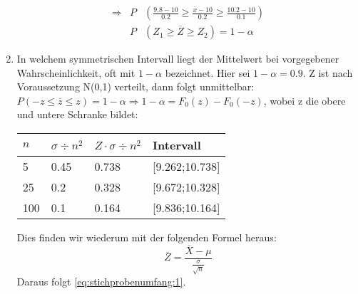 \begin{enumerate}
\begin{equation*}
\begin{array}{rcl}
\Longrightarrow&P&\left(\displaystyle\frac{9.8-10}{0.2}\geq\displaystyle\frac{\overline{x}-10}{0.2}\geq\displaystyle\frac{10.2-10}{0.1}\right)\\
&P&(Z_1\geq\overline{Z}\geq Z_2)=1-\alpha
\end{array}
\end{equation*}
\pagebreak[4]
\item In welchem symmetrischen Intervall liegt der Mittelwert bei vorgegebener Wahrscheinlichkeit, oft mit $1-\alpha$ bezeichnet. Hier sei $1-\alpha=0.9$. 
\subitem Z ist nach Voraussetzung N(0,1) verteilt, dann folgt unmittelbar: $P(-z\leq\overline{z}\leq z)=1-\alpha \Rightarrow 1-\alpha = F_0(z)-F_0(-z)$, wobei z die obere und untere Schranke bildet: 
\begin{table}[ht]
\centering
\begin{tabular}{@{}llll@{}}
\toprule
$n$ & $\sigma\div n^2$ & $Z\cdot \sigma \div n^2$ & Intervall \\ \midrule
5 & 0.45 & 0.738 & [9.262;10.738] \\
25 & 0.2 & 0.328 & [9.672;10.328] \\
100 & 0.1 & 0.164 & [9.836;10.164] \\ \bottomrule
\end{tabular}
\end{table}
Dies finden wir wiederum mit der folgenden Formel heraus:
\begin{equation*}
\overline{Z}=\frac{\overline{X}-\mu}{\frac{\sigma}{\sqrt{n}}}
\end{equation*}
Daraus folgt \autoref{eq:stichprobenumfang:1}.
\end{enumerate}


